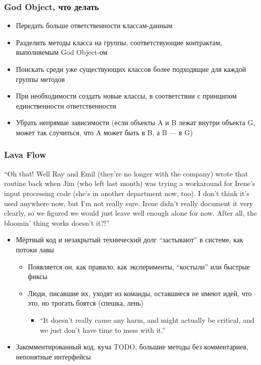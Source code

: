 \documentclass[xetex,mathserif,serif]{beamer}
\begin{document}
	\begin{frame}
		\frametitle{God Object, что делать}
		\begin{itemize}
			\item Передать больше ответственности классам-данным
			\item Разделить методы класса на группы, соответствующие контрактам, выполняемым God Object-ом
			\item Поискать среди уже существующих классов более подходящие для каждой группы методов
			\item При необходимости создать новые классы, в соответствии с принципом единственности ответственности
			\item Убрать непрямые зависимости (если объекты A и B лежат внутри объекта G, может так случиться, что A может быть в B, а B --- в G)
		\end{itemize}
	\end{frame}

	\begin{frame}
		\frametitle{Lava Flow}
		\begin{footnotesize}
			``Oh that! Well Ray and Emil (they’re no longer with the company) wrote that routine back when Jim (who left last month) was trying a workaround for Irene’s input processing code (she’s in another department now, too). I don’t think it’s used anywhere now, but I’m not really sure. Irene didn’t really document it very clearly, so we figured we would just leave well enough alone for now. After all, the bloomin’ thing works doesn’t it?!''
		\end{footnotesize}
		\vspace{0.3cm}
		\begin{itemize}
			\item Мёртвый код и незакрытый технический долг ``застывают'' в системе, как потоки лавы
			\begin{itemize}
				\item Появляется он, как правило, как эксперименты, ``костыли'' или быстрые фиксы
				\item Люди, писавшие их, уходят из команды, оставшиеся не имеют идей, что это, но трогать боятся (спешка, лень)
				\begin{itemize}
					\item ``It doesn’t really cause any harm, and might actually be critical, and we just don’t have time to mess with it.''
				\end{itemize}
			\end{itemize}
			\item Закомментированный код, куча TODO, большие методы без комментариев, непонятные интерфейсы
		\end{itemize}
	\end{frame}
\end{document}
